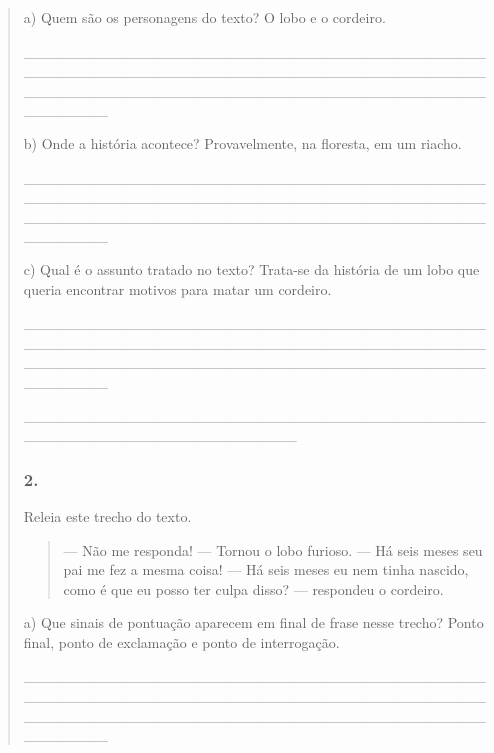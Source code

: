\begin{quote}
\begin{iteize}
a) Quem são os personagens do texto? O lobo e o cordeiro.

\_\_\_\_\_\_\_\_\_\_\_\_\_\_\_\_\_\_\_\_\_\_\_\_\_\_\_\_\_\_\_\_\_\_\_\_\_\_\_\_\_\_\_\_\_\_\_\_\_\_\_\_\_\_\_\_\_\_\_\_\_\_\_\_\_\_\_\_\_\_\_\_\_\_\_\_\_\_\_\_\_\_\_\_\_\_\_\_\_\_\_\_\_\_\_\_\_\_\_\_\_\_\_\_\_\_\_\_\_\_\_\_\_\_\_\_\_\_\_\_\_\_\_\_\_\_\_\_\_\_\_\_\_\_\_\_\_\_\_\_

b) Onde a história acontece? Provavelmente, na floresta, em um riacho.

\_\_\_\_\_\_\_\_\_\_\_\_\_\_\_\_\_\_\_\_\_\_\_\_\_\_\_\_\_\_\_\_\_\_\_\_\_\_\_\_\_\_\_\_\_\_\_\_\_\_\_\_\_\_\_\_\_\_\_\_\_\_\_\_\_\_\_\_\_\_\_\_\_\_\_\_\_\_\_\_\_\_\_\_\_\_\_\_\_\_\_\_\_\_\_\_\_\_\_\_\_\_\_\_\_\_\_\_\_\_\_\_\_\_\_\_\_\_\_\_\_\_\_\_\_\_\_\_\_\_\_\_\_\_\_\_\_\_\_\_

c) Qual é o assunto tratado no texto? Trata-se da história de um lobo
que queria encontrar motivos para matar um cordeiro.

\_\_\_\_\_\_\_\_\_\_\_\_\_\_\_\_\_\_\_\_\_\_\_\_\_\_\_\_\_\_\_\_\_\_\_\_\_\_\_\_\_\_\_\_\_\_\_\_\_\_\_\_\_\_\_\_\_\_\_\_\_\_\_\_\_\_\_\_\_\_\_\_\_\_\_\_\_\_\_\_\_\_\_\_\_\_\_\_\_\_\_\_\_\_\_\_\_\_\_\_\_\_\_\_\_\_\_\_\_\_\_\_\_\_\_\_\_\_\_\_\_\_\_\_\_\_\_\_\_\_\_\_\_\_\_\_\_\_\_\_

\_\_\_\_\_\_\_\_\_\_\_\_\_\_\_\_\_\_\_\_\_\_\_\_\_\_\_\_\_\_\_\_\_\_\_\_\_\_\_\_\_\_\_\_\_\_\_\_\_\_\_\_\_\_\_\_\_\_\_\_\_\_\_\_\_\_\_\_\_\_

\subsubsection{2. }\label{section-33}

Releia este trecho do texto.

\begin{quote}
--- Não me responda! --- Tornou o lobo furioso.
--- Há seis meses seu pai me fez a mesma coisa!
--- Há seis meses eu nem tinha nascido, como é que eu posso ter culpa disso? --- respondeu o cordeiro.
\end{quote}

a) Que sinais de pontuação aparecem em final de frase nesse trecho? Ponto final,
ponto de exclamação e ponto de interrogação.

\protect\hypertarget{_Hlk127460239}{}{}\_\_\_\_\_\_\_\_\_\_\_\_\_\_\_\_\_\_\_\_\_\_\_\_\_\_\_\_\_\_\_\_\_\_\_\_\_\_\_\_\_\_\_\_\_\_\_\_\_\_\_\_\_\_\_\_\_\_\_\_\_\_\_\_\_\_\_\_\_\_\_\_\_\_\_\_\_\_\_\_\_\_\_\_\_\_\_\_\_\_\_\_\_\_\_\_\_\_\_\_\_\_\_\_\_\_\_\_\_\_\_\_\_\_\_\_\_\_\_\_\_\_\_\_\_\_\_\_\_\_\_\_\_\_\_\_\_\_\_\_


\end{iteize}
\end{quote}

